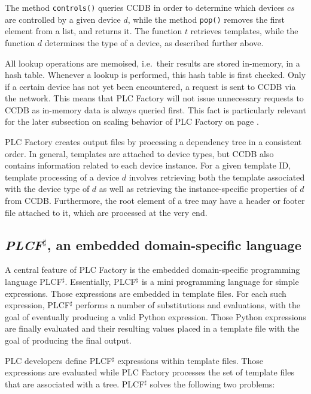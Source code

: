 \documentclass[a4paper,
              ]{jacow}
\begin{document}
The method \texttt{controls()} queries CCDB in order to determine which devices $\mathit{cs}$ are controlled by a given device $d$, while the method \texttt{pop()} removes the first element from a list, and returns it. The function $t$ retrieves templates, while the function $d$ determines the type of a device, as described further above.

All lookup operations are memoised, i.e.\ their results are stored in-memory, in a hash table. Whenever a lookup is performed, this hash table is first checked. Only if a certain device has not yet been encountered, a request is sent to CCDB via the network. This means that PLC Factory will not issue unnecessary requests to CCDB as in-memory data is always queried first. This fact is particularly relevant for the later subsection on scaling behavior of PLC Factory on page \pageref{subsec:runtime}.

PLC Factory creates output files by processing a dependency tree in a consistent order. In general, templates are attached to device types, but CCDB also contains information related to each device instance. For a given template ID, template processing of a device $d$ involves retrieving both the template associated with the device type of $d$ as well as retrieving the instance-specific properties of $d$ from CCDB. Furthermore, the root element of a tree may have a header or footer file attached to it, which are processed at the very end.

\subsection{\emph{PLCF$^\sharp$}, an embedded domain-specific language}
\label{subsec:plcf}
A central feature of PLC Factory is the embedded domain-specific programming language PLCF$^\sharp$. Essentially, PLCF$^\sharp$ is a mini programming language for simple expressions. Those expressions are embedded in template files. For each such expression, PLCF$^\sharp$ performs a number of substitutions and evaluations, with the goal of eventually producing a valid Python expression. Those Python expressions are finally evaluated and their resulting values placed in a template file with the goal of producing the final output.

PLC developers define PLCF$^\sharp$ expressions within template files. Those expressions are evaluated while PLC Factory processes the set of template files that are associated with a tree. PLCF$^\sharp$ solves the following two problems:
\end{document}
